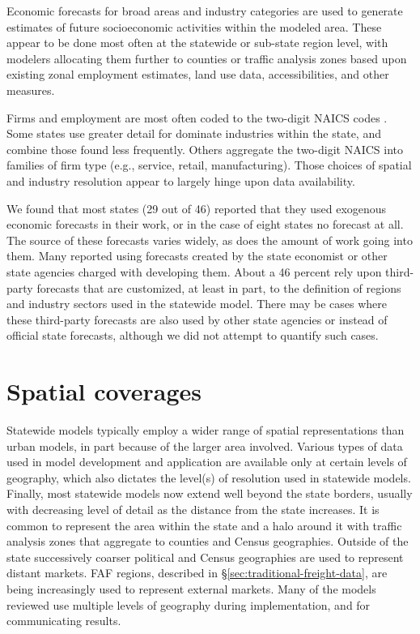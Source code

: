 
Economic forecasts for broad areas and industry categories are used to generate estimates of future socioeconomic activities within the modeled area. These appear to be done most often at the statewide or sub-state region level, with modelers allocating them further to counties or traffic analysis zones based upon existing zonal employment estimates, land use data, accessibilities, and other measures.

Firms and employment are most often coded to the two-digit NAICS codes \citep{censusbureau16}. Some states use greater detail for dominate industries within the state, and combine those found less frequently. Others aggregate the two-digit NAICS into families of firm type (e.g., service, retail, manufacturing). Those choices of spatial and industry resolution appear to largely hinge upon data availability.

We found that most states (29 out of 46) reported that they used exogenous economic forecasts in their work, or in the case of eight states no forecast at all. The source of these forecasts varies widely, as does the amount of work going into them. Many reported using forecasts created by the state economist or other state agencies charged with developing them. About a 46 percent rely upon third-party forecasts that are customized, at least in part, to the definition of regions and industry sectors used in the statewide model. There may be cases where these third-party forecasts are also used by other state agencies or instead of official state forecasts, although we did not attempt to quantify such cases.


\section{Spatial coverages}

Statewide models typically employ a wider range of spatial representations than urban models, in part because of the larger area involved. Various types of data used in model development and application are available only at certain levels of geography, which also dictates the level(s) of resolution used in statewide models. Finally, most statewide models now extend well beyond the state borders, usually with decreasing level of detail as the distance from the state increases. It is common to represent the area within the state and a halo around it with traffic analysis zones that aggregate to counties and Census geographies. Outside of the state successively coarser political and Census geographies are used to represent distant markets. FAF regions, described in \S\ref{sec:traditional-freight-data}, are being increasingly used to represent external markets. Many of the models reviewed use multiple levels of geography during implementation, and for communicating results.

